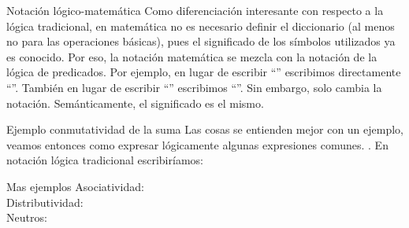 
\begin{frame}{Notación lógico-matemática}
  Como diferenciación interesante con respecto a la lógica tradicional, en matemática
  no es necesario definir el diccionario (al menos no para las operaciones básicas),
  pues el significado de los símbolos utilizados ya es conocido. Por eso, la notación matemática
  se mezcla con la notación de la lógica de predicados.
  \jump
  Por ejemplo, en lugar de escribir ``'' escribimos directamente
  ``''. También en lugar de escribir ``''
  escribimos ``''.
  \jump
  Sin embargo, solo cambia la notación. Semánticamente, el significado es el mismo.
\end{frame}


\begin{frame}{Ejemplo conmutatividad de la suma}
  Las cosas se entienden mejor con un ejemplo, veamos entonces como expresar
  lógicamente algunas expresiones comunes.
  \jump
  .
  \jump
  \jump
  En notación lógica tradicional escribiríamos:
\end{frame}


\begin{frame}{Mas ejemplos}
  Asociatividad:\\
  \jump
  Distributividad:\\
  \jump
  Neutros:\\
  \\
\end{frame}

